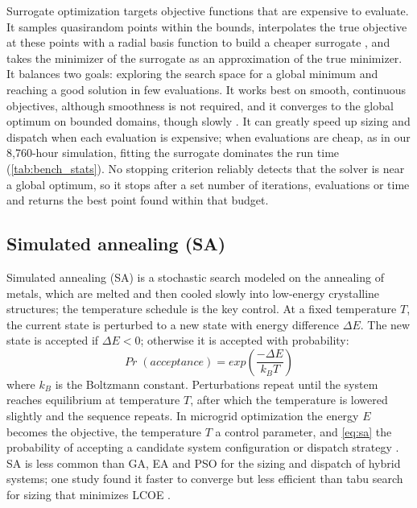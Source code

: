 \documentclass[final,3p,times]{elsarticle}
\begin{document}
Surrogate optimization targets objective functions that are expensive to evaluate. It samples quasirandom points within the bounds, interpolates the true objective at these points with a radial basis function to build a cheaper surrogate \cite{gutmann2001}, and takes the minimizer of the surrogate as an approximation of the true minimizer. It balances two goals: exploring the search space for a global minimum and reaching a good solution in few evaluations. It works best on smooth, continuous objectives, although smoothness is not required, and it converges to the global optimum on bounded domains, though slowly \cite{gutmann2001}. It can greatly speed up sizing and dispatch when each evaluation is expensive; when evaluations are cheap, as in our 8,760-hour simulation, fitting the surrogate dominates the run time (\cref{tab:bench_stats}). No stopping criterion reliably detects that the solver is near a global optimum, so it stops after a set number of iterations, evaluations or time and returns the best point found within that budget.

\subsection{Simulated annealing (SA)}

Simulated annealing (SA) is a stochastic search modeled on the annealing of metals, which are melted and then cooled slowly into low-energy crystalline structures; the temperature schedule is the key control. At a fixed temperature $T$, the current state is perturbed to a new state with energy difference $\Delta E$. The new state is accepted if $\Delta E < 0$; otherwise it is accepted with probability:
\begin{equation}
\label{eq:sa}
    Pr\;(acceptance) = exp\left(\frac{-\Delta E}{k_BT}\right)
\end{equation}
where $k_B$ is the Boltzmann constant. Perturbations repeat until the system reaches equilibrium at temperature $T$, after which the temperature is lowered slightly and the sequence repeats. In microgrid optimization the energy $E$ becomes the objective, the temperature $T$ a control parameter, and \cref{eq:sa} the probability of accepting a candidate system configuration or dispatch strategy \cite{fathima2015}. SA is less common than GA, EA and PSO for the sizing and dispatch of hybrid systems; one study found it faster to converge but less efficient than tabu search for sizing that minimizes LCOE \cite{sa_tabu}.

\end{document}
